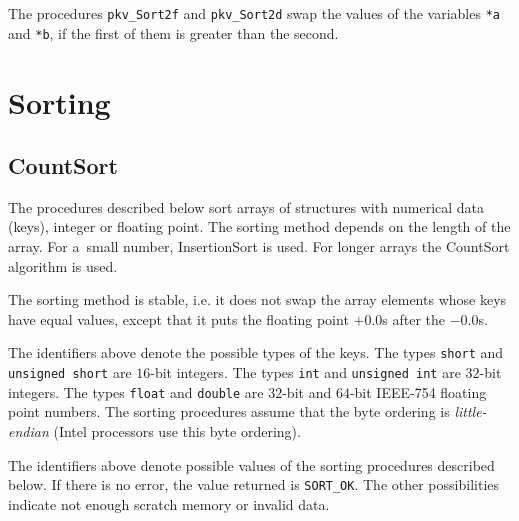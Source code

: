 \vspace{\bigskipamount}
The procedures \texttt{pkv\_Sort2f} and \texttt{pkv\_Sort2d} swap the
values of the variables \texttt{*a} and \texttt{*b}, if the first of them is
greater than the second.


\newpage
\section{Sorting}

\subsection{CountSort}

The procedures described below sort arrays of structures with numerical
data (keys), integer or floating point. The sorting method depends on the
length of the array. For a~small number, InsertionSort is used.
For longer arrays the CountSort algorithm is used.

The sorting method is stable, i.e. it does not swap the array elements
whose keys have equal values, except that it puts the floating point
$+0.0$s after the $-0.0$s.

\vspace{\bigskipamount}
The identifiers above denote the possible types of the keys.
The types \texttt{short} and \texttt{unsigned short} are $16$-bit integers.
The types \texttt{int} and \texttt{unsigned int} are $32$-bit integers.
The types \texttt{float} and \texttt{double} are $32$-bit and $64$-bit IEEE-754
floating point numbers. The sorting procedures assume that the byte
ordering is \emph{little-endian} (Intel processors use this byte ordering).

\vspace{\bigskipamount}
The identifiers above denote possible values of the sorting procedures
described below. If there is no error, the value returned is
\texttt{SORT\_OK}. The other possibilities indicate not enough
scratch memory or invalid data.

